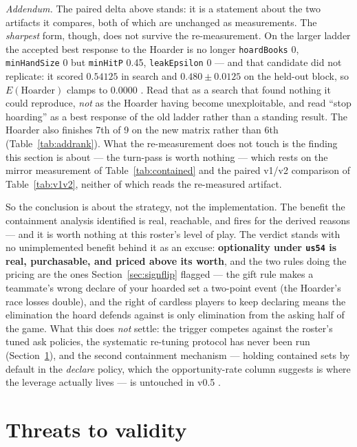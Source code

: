 \documentclass[11pt]{article}
\newcommand{\code}[1]{\texttt{#1}}
\newcommand{\usff}{\code{us54}}
\begin{document}
\emph{Addendum.} The paired delta above stands: it is a statement about the two artifacts it
compares, both of which are unchanged as measurements. The \emph{sharpest} form, though, does
not survive the re-measurement. On the larger ladder the accepted best response to the Hoarder
is no longer \code{hoardBooks} 0, \code{minHandSize} 0 but \code{minHitP} 0.45,
\code{leakEpsilon} 0 --- and that candidate did not replicate: it scored $0.54125$ in search
and $0.480 \pm 0.0125$ on the held-out block, so $E(\text{Hoarder})$ clamps to $0.0000$
\cite{artifactv2b}. Read that as a search that found nothing it could reproduce, \emph{not} as
the Hoarder having become unexploitable, and read ``stop hoarding'' as a best response of the
old ladder rather than a standing result. The Hoarder also finishes 7th of 9 on the new matrix
rather than 6th (Table~\ref{tab:addrank}). What the re-measurement does not touch is the
finding this section is about --- the turn-pass is worth nothing --- which rests on the mirror
measurement of Table~\ref{tab:contained} and the paired v1/v2 comparison of
Table~\ref{tab:v1v2}, neither of which reads the re-measured artifact.

So the conclusion is about the strategy, not the implementation. The benefit the containment
analysis identified is real, reachable, and fires for the derived reasons --- and it is worth
nothing at this roster's level of play. The verdict stands with no unimplemented benefit
behind it as an excuse: \textbf{optionality under \usff{} is real, purchasable, and priced
above its worth}, and the two rules doing the pricing are the ones
Section~\ref{sec:signflip} flagged --- the gift rule makes a teammate's wrong declare of your
hoarded set a two-point event (the Hoarder's race losses double), and the right of cardless
players to keep declaring means the elimination the hoard defends against is only elimination
from the asking half of the game. What this does \emph{not} settle: the trigger competes
against the roster's tuned ask policies, the systematic re-tuning protocol has never been run
(Section~\ref{sec:threats}), and the second containment mechanism --- holding contained sets
by default in the \emph{declare} policy, which the opportunity-rate column suggests is where
the leverage actually lives --- is untouched in v0.5 \cite{styles}.

\section{Threats to validity}
\label{sec:threats}
\end{document}
